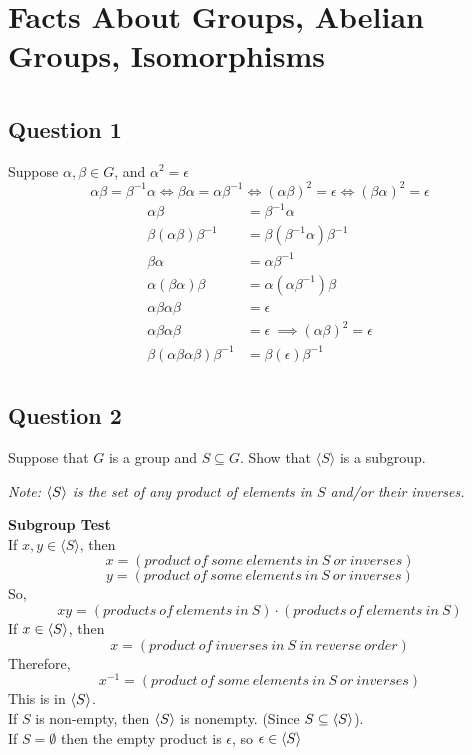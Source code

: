 \documentclass[openany]{report}
\begin{document}
\section{}

\chapter{Facts About Groups, Abelian Groups, Isomorphisms}
\chapter{}
\section{Question 1}
Suppose $\alpha,\beta \in G$, and $\alpha^2 = \epsilon$
$$\alpha\beta = \beta^{-1}\alpha \iff \beta\alpha = \alpha\beta^{-1} \iff (\alpha\beta)^2 = \epsilon \iff (\beta\alpha)^2 = \epsilon$$
\begin{align*}
    \alpha\beta &= \beta^{-1}\alpha\\
    \beta(\alpha\beta)\beta^{-1} &= \beta(\beta^{-1}\alpha)\beta^{-1}\\
    \beta\alpha &= \alpha\beta^{-1}\\
    \alpha(\beta\alpha)\beta &= \alpha(\alpha\beta^{-1}) \beta\\
    \alpha\beta\alpha\beta &= \epsilon\tag{$\alpha\alpha=\alpha^2=\epsilon$}\\
    \alpha\beta\alpha\beta &=\epsilon\ \implies ( \alpha\beta)^2 = \epsilon\\
    \beta(\alpha\beta\alpha\beta)\beta^{-1} &= \beta(\epsilon)\beta^{-1}\\
\end{align*}

\section{Question 2}
Suppose that $G$ is a group and $S \subseteq G$. Show that $\langle S\rangle$ is a subgroup.
\begin{center}
    \textit{Note: $\langle S \rangle$ is the set of any product of elements in $S$ and/or their inverses.}
\end{center}
\textbf{Subgroup Test}\\
If $x,y \in \langle S \rangle$, then 
$$x = (product \ of \ some \ elements \ in \ S \ or \ inverses)$$
$$y = (product \ of \ some \ elements \ in \ S \ or \ inverses)$$
So,
$$xy = (products \ of \ elements \ in \ S) \cdot (products \ of \ elements \ in \  S) $$
If $x \in \langle S \rangle$, then 
$$x = (product \ of \ inverses \ in \ S \ in \ reverse \ order)$$
Therefore,
$$x^{-1} = (product \ of \ some \ elements \ in \ S \ or \ inverses)$$
This is in $\langle S \rangle$.\\
If $S$ is non-empty, then $\langle S \rangle$ is nonempty. (Since $S \subseteq \langle S \rangle$).\\
If $S = \emptyset$ then the empty product is $\epsilon$, so $\epsilon \in \langle S \rangle$
\end{document}
